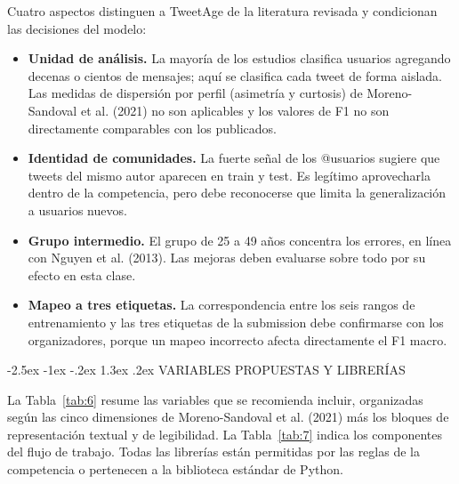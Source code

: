\documentclass[10pt,twocolumn]{article}
\makeatletter
\renewcommand{\section}{\@startsection{section}{1}{\z@}%
  {-2.5ex \@plus -1ex \@minus -.2ex}%
  {1.3ex \@plus .2ex}%
  {\normalfont\large\bfseries\centering}}
\makeatother
\begin{document}
Cuatro aspectos distinguen a TweetAge de la literatura revisada y condicionan las decisiones del modelo:

\begin{itemize}\setlength{\itemsep}{2pt}
\item \textbf{Unidad de análisis.} La mayoría de los estudios clasifica usuarios agregando decenas o cientos de mensajes; aquí se clasifica cada tweet de forma aislada. Las medidas de dispersión por perfil (asimetría y curtosis) de Moreno-Sandoval et al. (2021) no son aplicables y los valores de F1 no son directamente comparables con los publicados.
\item \textbf{Identidad de comunidades.} La fuerte señal de los @usuarios sugiere que tweets del mismo autor aparecen en train y test. Es legítimo aprovecharla dentro de la competencia, pero debe reconocerse que limita la generalización a usuarios nuevos.
\item \textbf{Grupo intermedio.} El grupo de 25 a 49 años concentra los errores, en línea con Nguyen et al. (2013). Las mejoras deben evaluarse sobre todo por su efecto en esta clase.
\item \textbf{Mapeo a tres etiquetas.} La correspondencia entre los seis rangos de entrenamiento y las tres etiquetas de la submission debe confirmarse con los organizadores, porque un mapeo incorrecto afecta directamente el F1 macro.
\end{itemize}

\section{VARIABLES PROPUESTAS Y LIBRERÍAS}\label{sec:11}

La Tabla~\ref{tab:6} resume las variables que se recomienda incluir, organizadas según las cinco dimensiones de Moreno-Sandoval et al. (2021) más los bloques de representación textual y de legibilidad. La Tabla~\ref{tab:7} indica los componentes del flujo de trabajo. Todas las librerías están permitidas por las reglas de la competencia o pertenecen a la biblioteca estándar de Python.
\end{document}

